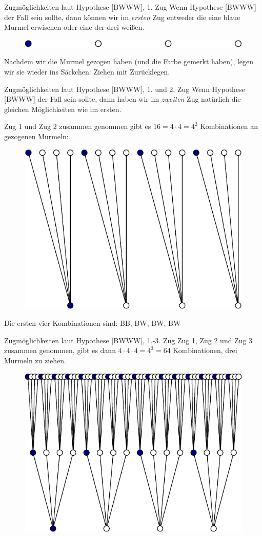 \documentclass[
  ngerman,
  ignorenonframetext,
]{beamer}
\begin{document}
\begin{frame}{Zugmöglichkeiten laut Hypothese {[}BWWW{]}, 1. Zug}
\protect\hypertarget{zugmuxf6glichkeiten-laut-hypothese-bwww-1.-zug}{}
Wenn Hypothese {[}BWWW{]} der Fall sein sollte, dann können wir im
\emph{ersten} Zug entweder die eine blaue Murmel erwischen oder eine der
drei weißen.

\begin{figure}[H]
\includegraphics[width=0.7\linewidth]{unnamed-chunk-7-1} \end{figure}

Nachdem wir die Murmel gezogen haben (und die Farbe gemerkt haben),
legen wir sie wieder ins Säckchen: Ziehen mit Zurücklegen.
\end{frame}

\begin{frame}{Zugmöglichkeiten laut Hypothese {[}BWWW{]}, 1. und 2. Zug}
\protect\hypertarget{zugmuxf6glichkeiten-laut-hypothese-bwww-1.-und-2.-zug}{}
Wenn Hypothese {[}BWWW{]} der Fall sein sollte, dann haben wir im
\emph{zweiten} Zug natürlich die gleichen Möglichkeiten wie im ersten.

Zug 1 und Zug 2 zusammen genommen gibt es \(16=4\cdot4=4^2\)
Kombinationen an gezogenen Murmeln:

\begin{figure}[H]
\includegraphics[width=0.5\linewidth]{unnamed-chunk-8-1} \end{figure}

Die ersten vier Kombinationen sind: BB, BW, BW, BW
\end{frame}

\begin{frame}{Zugmöglichkeiten laut Hypothese {[}BWWW{]}, 1.-3. Zug}
\protect\hypertarget{zugmuxf6glichkeiten-laut-hypothese-bwww-1.-3.-zug}{}
Zug 1, Zug 2 und Zug 3 zusammen genommen, gibt es dann
\(4\cdot4\cdot4=4^3=64\) Kombinationen, drei Murmeln zu ziehen.

\begin{figure}[H]
\includegraphics[width=0.5\linewidth]{unnamed-chunk-9-1} \end{figure}
\end{frame}
\end{document}
